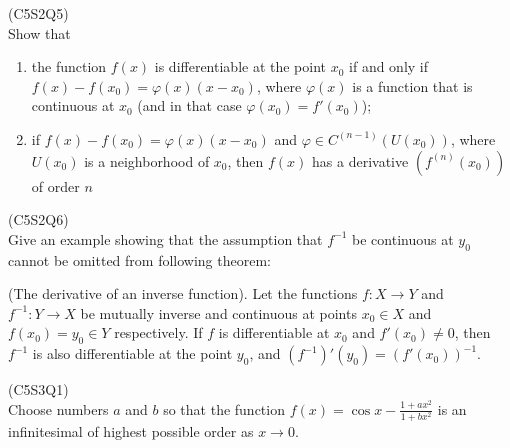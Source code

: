 \begin{prb}
    (C5S2Q5) \\
    Show that
    \begin{enumerate}
        \item[a)] the function $f(x)$ is differentiable at the point $x_0$ if and only if $f(x) - f(x_0) = \varphi(x)(x - x_0)$, where $\varphi(x)$ is a function that 
        is continuous at $x_0$ (and in that case $\varphi(x_0) = f'(x_0)$);
        \item[b)] if $f(x) - f(x_0) = \varphi(x)(x - x_0)$ and $\varphi \in C^{(n-1)} \left( U(x_0) \right)$, where $U(x_0)$ is a neighborhood of $x_0$, then $f(x)$ has a 
        derivative $(f^{(n)}(x_0))$ of order $n$
    \end{enumerate}
\end{prb}

\begin{prb}
    (C5S2Q6) \\
    Give an example showing that the assumption that $f^{-1}$ be continuous at $y_0$ cannot be omitted from following theorem: \\
    \begin{thm}
        (The derivative of an inverse function). Let the functions $f : X \to Y$ and $f^{-1} : Y \to X$ be mutually inverse and continuous at points $x_0 \in X$ and 
        $f(x_0) = y_0 \in Y$ respectively. If $f$ is differentiable at $x_0$ and $f'(x_0) \neq 0$, then $f^{-1}$ is also differentiable at the point $y_0$, and 
        $(f^{-1})'(y_0) = (f'(x_0))^{-1}$.
    \end{thm}
\end{prb}

\begin{prb}
    (C5S3Q1) \\
    Choose numbers $a$ and $b$ so that the function $f(x) = \cos x - \frac{1+ax^2}{1+bx^2}$ is an infinitesimal of highest possible order as $x \to 0$.
\end{prb}

